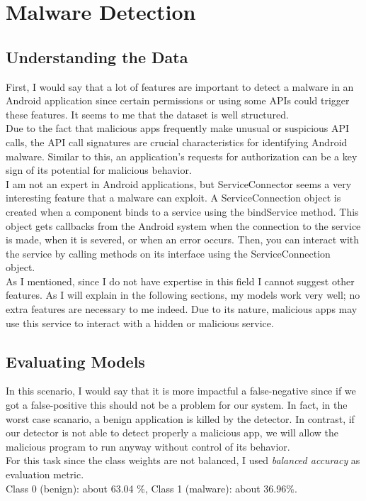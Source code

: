 \documentclass[unicode,11pt,a4paper,oneside,numbers=endperiod,openany]{scrartcl}
\begin{document}
\setassignment

\newline
\section{Malware Detection}


\subsection{Understanding the Data}
First, I would say that a lot of features are important to detect a malware in an Android application since certain permissions or using some APIs could trigger these features. It seems to me that the dataset is well structured.  \\
Due to the fact that malicious apps frequently make unusual or suspicious API calls, the API call signatures are crucial characteristics for identifying Android malware. Similar to this, an application's requests for authorization can be a key sign 
of its potential for malicious behavior. \\
I am not an expert in Android applications, but ServiceConnector seems a very interesting feature that a malware can exploit. 
A ServiceConnection object is created when a component binds to a service using the bindService method. This object gets callbacks from the Android system when the connection to the service is made, when it is severed, or when an error occurs. Then, you can interact with the service by calling methods on its interface using the ServiceConnection object.\\
As I mentioned, since I do not have expertise in this field I cannot suggest other features. As I will explain in the following sections, my models work very well; no extra features are necessary to me indeed.
Due to its nature, malicious apps may use this service to interact with a hidden or malicious service.
\subsection{Evaluating Models}
In this scenario,
 I would say that 
 it is more impactful 
 a false-negative since 
 if we got a false-positive 
 this should not be a problem for our system.
 In fact, in the worst case scanario, 
 a benign application is killed by the detector. 
 In contrast, if our detector is not able to 
 detect properly a malicious app, we will allow
  the malicious program to run anyway without 
  control of its behavior. \\
For this task since the class weights are not balanced, I used \textit{balanced accuracy} as evaluation metric. \\
Class 0 (benign): about 63.04 \%, Class 1 (malware):  about 36.96\%. \\
\end{document}
